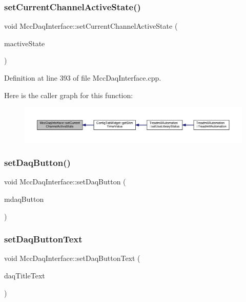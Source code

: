 \subsubsection{\texorpdfstring{set\+Current\+Channel\+Active\+State()}{setCurrentChannelActiveState()}}
{\footnotesize\ttfamily void Mcc\+Daq\+Interface\+::set\+Current\+Channel\+Active\+State (\begin{DoxyParamCaption}\item[{bool}]{mactive\+State }\end{DoxyParamCaption})}



Definition at line 393 of file Mcc\+Daq\+Interface.\+cpp.

Here is the caller graph for this function\+:
\nopagebreak
\begin{figure}[H]
\begin{center}
\leavevmode
\includegraphics[width=350pt]{class_mcc_daq_interface_a3024b53b897a0e7778fd5c2df7932999_icgraph}
\end{center}
\end{figure}
\mbox{\label{class_mcc_daq_interface_a64c1207013b4a2f6782131017658f527}} 
\subsubsection{\texorpdfstring{set\+Daq\+Button()}{setDaqButton()}}
{\footnotesize\ttfamily void Mcc\+Daq\+Interface\+::set\+Daq\+Button (\begin{DoxyParamCaption}\item[{Q\+Push\+Button $\ast$}]{mdaq\+Button }\end{DoxyParamCaption})}

\mbox{\label{class_mcc_daq_interface_a43bef970ad375bca8b4c5892346629b6}} 
\subsubsection{\texorpdfstring{set\+Daq\+Button\+Text}{setDaqButtonText}}
{\footnotesize\ttfamily void Mcc\+Daq\+Interface\+::set\+Daq\+Button\+Text (\begin{DoxyParamCaption}\item[{Q\+String}]{daq\+Title\+Text }\end{DoxyParamCaption})\hspace{0.3cm}{\ttfamily [slot]}}



